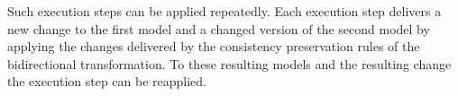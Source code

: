 \begin{definition}
\end{definition}

Such execution steps can be applied repeatedly.
Each execution step delivers a new change to the first model and a changed version of the second model by applying the changes delivered by the consistency preservation rules of the bidirectional transformation.
To these resulting models and the resulting change the execution step can be reapplied.

